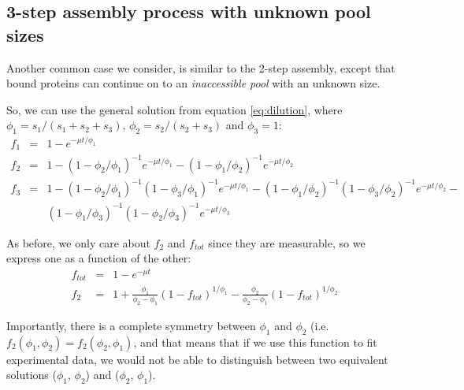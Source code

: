 \documentclass{article}
\begin{document}
\subsection{3-step assembly process with unknown pool sizes}
Another common case we consider, is similar to the 2-step assembly, except that bound proteins can continue on to an \textit{inaccessible pool} with an unknown size.

So, we can use the general solution from equation \ref{eq:dilution}, where $\phi_1 = s_1 / (s_1 + s_2 + s_3)$, $\phi_2 = s_2 / (s_2 + s_3)$ and $\phi_3 = 1$:
\begin{eqnarray}
    f_1 &=& 1 - e^{- \mu t / \phi_1} \nonumber\\
    f_2 &=& 1 - \left(1 - \phi_2 / \phi_1 \right)^{-1} e^{- \mu t / \phi_1} - \left(1 - \phi_1 / \phi_2 \right)^{-1} e^{- \mu t / \phi_2} \nonumber\\
    f_3 &=& 1 - \left(1 - \phi_2 / \phi_1 \right)^{-1} \left(1 - \phi_3 / \phi_1 \right)^{-1} e^{- \mu t / \phi_1} - \left(1 - \phi_1 / \phi_2 \right)^{-1} \left(1 - \phi_3 / \phi_2 \right)^{-1} e^{- \mu t / \phi_2} - \nonumber\\
    && \left(1 - \phi_1 / \phi_3 \right)^{-1} \left(1 - \phi_2 / \phi_3 \right)^{-1} e^{- \mu t / \phi_3}
\end{eqnarray}

As before, we only care about $f_2$ and $f_{tot}$ since they are measurable, so we express one as a function of the other:
\begin{eqnarray}
    f_{tot} &=& 1 - e^{- \mu t}\nonumber\\
    f_2 &=& 1 + \frac{\phi_1}{\phi_2 - \phi_1} (1 - f_{tot})^{1/{\phi_1}} - \frac{\phi_2}{\phi_2-\phi_1} (1 - f_{tot})^{1/{\phi_2}} \label{eq:three_step_f2}
\end{eqnarray}

Importantly, there is a complete symmetry between $\phi_1$ and $\phi_2$ (i.e. $f_2(\phi_1, \phi_2) = f_2(\phi_2, \phi_1)$, and that means that if we use this function to fit experimental data, we would not be able to distinguish between two equivalent solutions ($\phi_1$, $\phi_2$) and ($\phi_2$, $\phi_1$).
\end{document}
